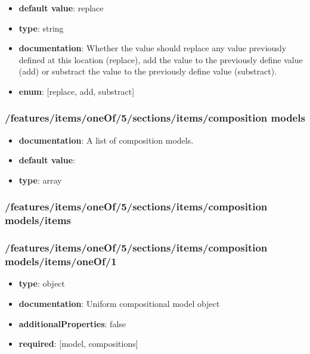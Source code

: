 \begin{itemize}\item {\bf default value}: replace
\item {\bf type}: string
\item {\bf documentation}: Whether the value should replace any value previously defined at this location (replace), add the value to the previously define value (add) or substract the value to the previously define value (substract).
\item {\bf enum}: [replace, add, substract]\end{itemize}\subsubsection{/features/items/oneOf/5/sections/items/composition models}
\begin{itemize}\item {\bf documentation}: A list of composition models.
\item {\bf default value}: 
\item {\bf type}: array
\end{itemize}\subsubsection{/features/items/oneOf/5/sections/items/composition models/items}

\subsubsection{/features/items/oneOf/5/sections/items/composition models/items/oneOf/1}
\begin{itemize}\item {\bf type}: object
\item {\bf documentation}: Uniform compositional model object
\item {\bf additionalProperties}: false
\item {\bf required}: [model, compositions]\end{itemize}
